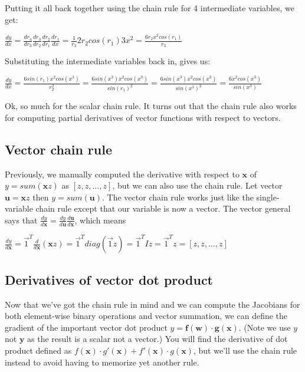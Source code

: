 \documentclass[11pt]{article}
\begin{document}
Putting it all back together using the chain rule for 4 intermediate variables, we get:

$\frac{dy}{dx} = \frac{d r_4}{dr_3} \frac{dr_3}{d r_2} \frac{dr_2}{dr_1} \frac{dr_1}{dx} = \frac{1}{r_3}  2r_2  cos(r_1)  3x^2 = \frac{6r_2x^2cos(r_1)}{r_3}$

Substituting the intermediate variables back in, gives us:

$\frac{dy}{dx} = \frac{6sin(r_1)x^2cos(x^3)}{r_2^2} = \frac{6sin(x^3)x^2cos(x^3)}{sin(r_1)^2} = \frac{6sin(x^3)x^2cos(x^3)}{sin(x^3)^2} = \frac{6x^2cos(x^3)}{sin(x^3)}$

Ok, so much for the scalar chain rule. It turns out that the chain rule also works for computing partial derivatives of vector functions with respect to vectors.

\subsection{Vector chain rule}

Previously, we manually computed the derivative with respect to $\mathbf{x}$ of $y = sum(\mathbf{x}  z)$ as $[z, z, \ldots, z]$, but we can also use the chain rule. Let vector $\mathbf{u} = \mathbf{x}  z$ then $y = sum(\mathbf{u})$. The vector chain rule works just like the single-variable chain rule except that our variable is now a vector.  The vector general says that $\frac{dy}{d\mathbf{x}} = \frac{dy}{d\mathbf{u}}  \frac{d\mathbf{u}}{d\mathbf{x}}$, which means 

$\frac{dy}{d\mathbf{x}} = \vec{1}^T  \frac{d}{d\mathbf{x}} (\mathbf{x}  z) = \vec{1}^T  diag(\vec{1}z) = \vec{1}^T  I  z = \vec{1}^T  z = [z, z, \ldots, z]$

\subsection{Derivatives of vector dot product}

Now that we've got the chain rule in mind and we can compute the Jacobians for both element-wise binary operations and vector summation, we can define the gradient of the important vector dot product $y = \mathbf{f(w)} \cdot \mathbf{g(x)}$. (Note we use $y$ not $\mathbf{y}$ as the result is a scalar not a vector.) You will find the derivative of dot product defined as $f(\mathbf{x}) \cdot g'(\mathbf{x}) + f'(\mathbf{x}) \cdot g(\mathbf{x})$, but we'll use the chain rule instead to avoid having to memorize yet another rule.
\end{document}
